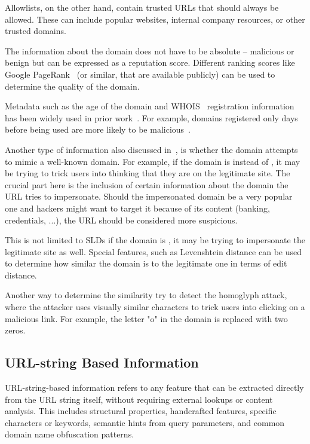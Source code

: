 Allowlists, on the other hand, contain trusted URLs that should always be allowed. These can include popular websites, internal company resources, or other trusted domains.

The information about the domain does not have to be absolute -- malicious or benign but can be expressed as a reputation score. Different ranking scores like Google PageRank~\cite{Page1998PageRank} (or similar, that are available publicly) can be used to determine the quality of the domain.

Metadata such as the age of the domain and WHOIS~\cite{whois} registration information has been widely used in prior work~\cite{surveymaliciousfeatures}. For example, domains registered only days before being used are more likely to be malicious~\cite{surveymaliciousfeatures}.

Another type of information also discussed in~\cite{surveymaliciousfeatures}, is whether the domain attempts to mimic a well-known domain. For example, if the domain is  instead of , it may be trying to trick users into thinking that they are on the legitimate site. The crucial part here is the inclusion of certain information about the domain the URL tries to impersonate. Should the impersonated domain be a very popular one and hackers might want to target it because of its content (banking, credentials, ...), the URL should be considered more suspicious.

This is not limited to SLDs if the domain is , it may be trying to impersonate the legitimate site as well. Special features, such as Levenshtein distance can be used to determine how similar the domain is to the legitimate one in terms of edit distance.

Another way to determine the similarity try to detect the homoglyph attack, where the attacker uses visually similar characters to trick users into clicking on a malicious link. For example, the letter "o" in the domain  is replaced with two zeros.

\subsection{URL-string Based Information}
URL-string-based information refers to any feature that can be extracted directly from the URL string itself, without requiring external lookups or content analysis. This includes structural properties, handcrafted features, specific characters or keywords, semantic hints from query parameters, and common domain name obfuscation patterns.

